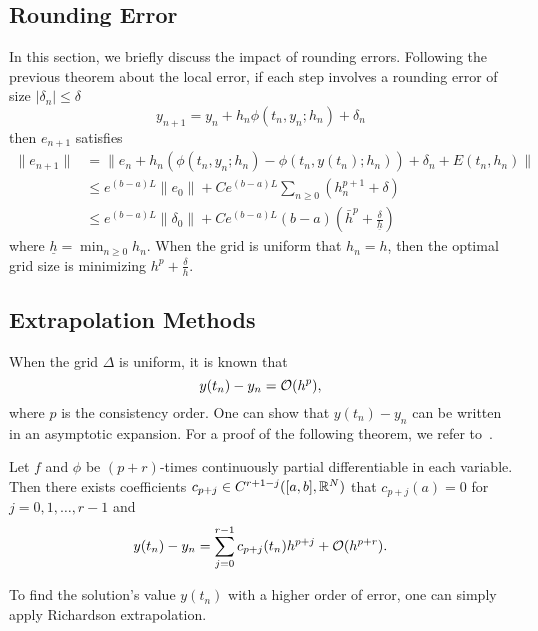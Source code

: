 \subsection{Rounding Error}
In this section, we briefly discuss the impact of rounding errors. 
Following the previous theorem about the local error, if each step involves a rounding error of size $|\delta_n|\le \delta$ 
\begin{equation}
    y_{n+1} = y_n + h_n \phi(t_n, y_n; h_n) + \delta_n 
\end{equation}
then $e_{n+1}$ satisfies 
\begin{equation}
    \begin{aligned}
        \|e_{n+1}\| & = \|e_n + h_n(\phi(t_n, y_n;h_n) - \phi(t_n, y(t_n); h_n)) + \delta_n + E(t_n, h_n)  \|  \\
        &\le  e^{(b-a)L} \|e_0\| + C e^{(b-a)L} \sum_{n\ge 0}(h_n^{p+1} +\delta) \\
        &\le e^{(b-a)L} \|\delta_0\| + C e^{(b-a)L}  (b-a) \left( \bar{h}^p + \frac{\delta}{\underline{h}}\right)
    \end{aligned}
\end{equation}
where $\underline{h} = \min_{n\ge 0} h_n$. When the grid is uniform that $h_n = h$, then the optimal grid size is minimizing $h^p + \frac{\delta}{h}$.
\subsection{Extrapolation Methods}
When the grid $\Delta$ is uniform, it is known that 
$$y(t_n) - y_n = \mathcal O(h^p),$$
where $p$ is the consistency order. One can show that $y(t_n) - y_n$ can be written in an asymptotic expansion. For a proof of the following theorem, we refer to~\cite{gragg1965extrapolation}.
\begin{theorem}
    Let $f$ and $\phi$ be $(p+r)$-times continuously partial differentiable in each variable. Then there exists coefficients $c_{p+j}\in C^{r+1- j}([a, b],\mathbb R^N)$ that $c_{p+j}(a) = 0$ for $j=0,1,\dots, r-1$ and 
    \begin{equation}
        y(t_n) - y_n = \sum_{j=0}^{r-1} c_{p+j}(t_n) h^{p+j} + \mathcal O(h^{p+r}).
    \end{equation}
\end{theorem}
To find the solution's value $y(t_n)$ with a higher order of error, one can simply apply Richardson extrapolation.
